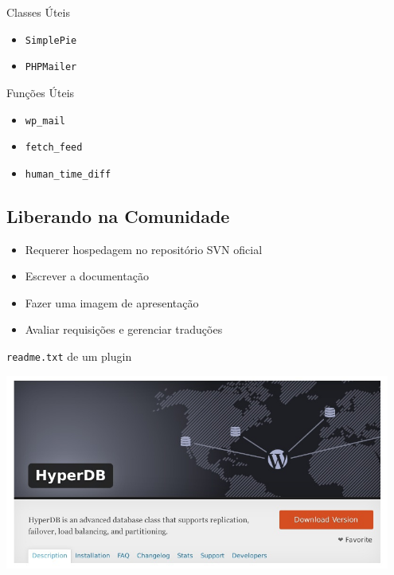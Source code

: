 \documentclass{beamer}
\begin{document}
\begin{frame}{Classes Úteis}
\begin{itemize}
  \pause \item \texttt{SimplePie}
  \pause \item \texttt{PHPMailer}
\end{itemize}
\end{frame}

\begin{frame}{Funções Úteis}
\begin{itemize}
  \pause \item \texttt{wp\_mail}
  \pause \item \texttt{fetch\_feed}
  \pause \item \texttt{human\_time\_diff}
\end{itemize}
\end{frame}

\subsection{Liberando na Comunidade}

\begin{itemize}
  \pause \item Requerer hospedagem no repositório SVN oficial
  \pause \item Escrever a documentação
  \pause \item Fazer uma imagem de apresentação
  \pause \item Avaliar requisições e gerenciar traduções
\end{itemize}

\begin{frame}{\texttt{readme.txt} de um plugin}
  
\end{frame}

\begin{frame}
\begin{center}
  \includegraphics[width=0.95\textwidth]{./img/hyperdb-screen.jpg}
\end{center}
\end{frame}
\end{document}
